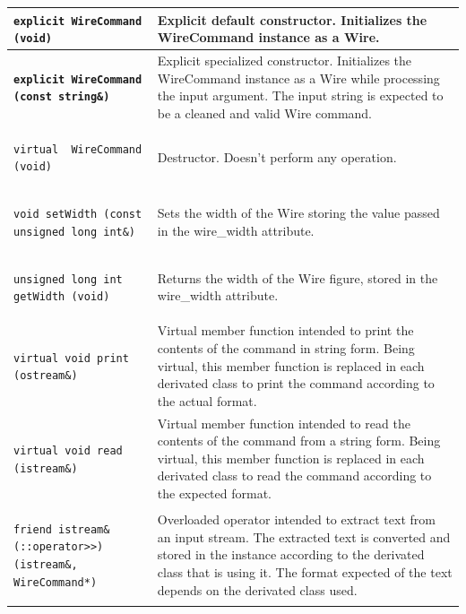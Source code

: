 \documentclass[11pt,twoside,openany,x11names,svgnames]{memoir}
\begin{document}
\begin{table}[h]\footnotesize
\centering
\begin{tabular}{| >{\bfseries}p{9.5cm} | p{6cm} |}
	\hline
	
	\texttt{explicit WireCommand (void)} & Explicit default constructor. Initializes the WireCommand instance as a Wire. \\
	
	\hline
	
	\texttt{explicit WireCommand (const string\&)} & Explicit specialized constructor. Initializes the WireCommand instance as a Wire while processing the input argument. The input string is expected to be a cleaned and valid Wire command. \\
	
	\hline
	
	\texttt{virtual ~WireCommand (void)} & Destructor. Doesn't perform any operation. \\
	
	\hline
	
	\texttt{void setWidth (const unsigned long int\&)} & Sets the width of the Wire storing the value passed in the wire\_width attribute. \\
	
	\hline	
	
	\texttt{unsigned long int getWidth (void)} & Returns the width of the Wire figure, stored in the wire\_width attribute. \\
	
	\hline	
	
	\texttt{virtual void print (ostream\&)} & Virtual member function intended to print the contents of the command in string form. Being virtual, this member function is replaced in each derivated class to print the command according to the actual format. \\
	
	\hline
	
	\texttt{virtual void read (istream\&)} & Virtual member function intended to read the contents of the command from a string form. Being virtual, this member function is replaced in each derivated class to read the command according to the expected format. \\
	
	\hline	
		
	\texttt{friend istream\& (::operator>>) (istream\&, WireCommand*)} & Overloaded operator intended to extract text from an input stream. The extracted text is converted and stored in the instance according to the derivated class that is using it. The format expected of the text depends on the derivated class used. \\
	

\end{tabular}
\end{table}
\end{document}
